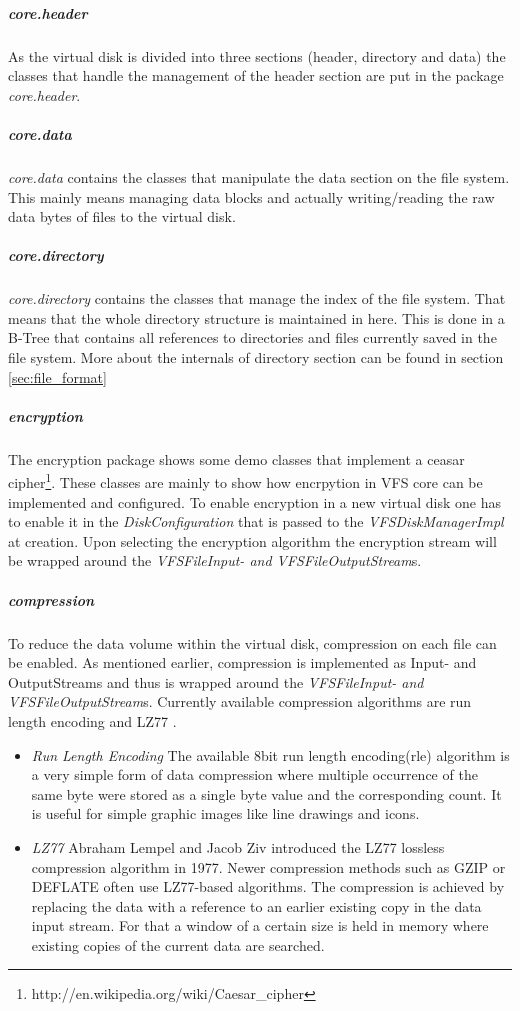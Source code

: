 \subparagraph{core.header}
As the virtual disk is divided into three sections (header, directory and data)
the classes that handle the management of the header section are put in the
package \textit{core.header}.
\subparagraph{core.data}
\textit{core.data} contains the classes that manipulate the data section on the
file system. This mainly means managing data blocks and actually writing/reading
the raw data bytes of files to the virtual disk.
\subparagraph{core.directory}
\textit{core.directory} contains the classes that manage the index of the file
system. That means that the whole directory structure is maintained in here.
This is done in a B-Tree that contains all references to directories and files
currently saved in the file system. More about the internals of directory
section can be found in section \ref{sec:file_format}

\subparagraph{encryption}
The encryption package shows some demo classes that implement a ceasar
cipher\footnote{http://en.wikipedia.org/wiki/Caesar\_cipher}. These classes are
mainly to show how encrpytion in VFS core can be implemented and configured. To
enable encryption in a new virtual disk one has to enable it in the
\textit{DiskConfiguration} that is passed to the \textit{VFSDiskManagerImpl} at
creation. Upon selecting the encryption algorithm the encryption stream will be
wrapped around the \textit{VFSFileInput- and VFSFileOutputStream}s.

\subparagraph{compression}

To reduce the data volume within the virtual disk, compression on each file can
be enabled. As mentioned earlier, compression is implemented as Input- and
OutputStreams and thus is wrapped around the \textit{VFSFileInput- and
VFSFileOutputStream}s. Currently available compression algorithms are run length
encoding \cite{rle} and LZ77 \cite{lz77}.

\begin{itemize}
  \item {\textit{Run Length Encoding}} The available 8bit run length
  encoding(rle) algorithm is a very simple form of data compression where
  multiple occurrence of the same byte were stored as a single byte value and
  the corresponding count. It is useful for simple graphic images like line
  drawings and icons.
  \item {\textit{LZ77}} Abraham Lempel and Jacob Ziv introduced the LZ77 lossless
  compression algorithm in 1977. Newer compression methods such as GZIP or DEFLATE often use LZ77-based
  algorithms. The compression is achieved by replacing the data with a reference
  to an earlier existing copy in the data input stream. For that a window of
  a certain size is held in memory where existing copies of the current data are
  searched.
\end{itemize}




